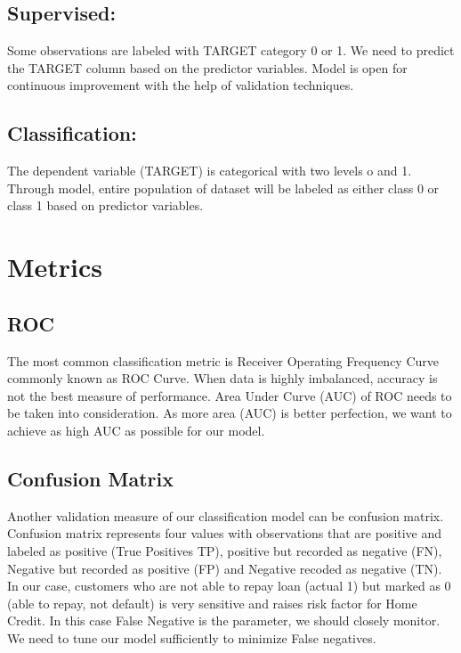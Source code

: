 \documentclass[]{book}
\begin{document}
\hypertarget{supervised}{%
\section{Supervised:}\label{supervised}}

Some observations are labeled with TARGET category 0 or 1. We need to predict the TARGET column based on the predictor variables. Model is open for continuous improvement with the help of validation techniques.

\hypertarget{classification}{%
\section{Classification:}\label{classification}}

The dependent variable (TARGET) is categorical with two levels o and 1. Through model, entire population of dataset will be labeled as either class 0 or class 1 based on predictor variables.

\hypertarget{metrics}{%
\chapter{Metrics}\label{metrics}}

\hypertarget{roc}{%
\section{ROC}\label{roc}}

The most common classification metric is Receiver Operating Frequency Curve commonly known as ROC Curve. When data is highly imbalanced, accuracy is not the best measure of performance. Area Under Curve (AUC) of ROC needs to be taken into consideration. As more area (AUC) is better perfection, we want to achieve as high AUC as possible for our model.

\hypertarget{confusion-matrix}{%
\section{Confusion Matrix}\label{confusion-matrix}}

Another validation measure of our classification model can be confusion matrix. Confusion matrix represents four values with observations that are positive and labeled as positive (True Positives TP), positive but recorded as negative (FN), Negative but recorded as positive (FP) and Negative recoded as negative (TN). In our case, customers who are not able to repay loan (actual 1) but marked as 0 (able to repay, not default) is very sensitive and raises risk factor for Home Credit. In this case False Negative is the parameter, we should closely monitor. We need to tune our model sufficiently to minimize False negatives.
\end{document}

